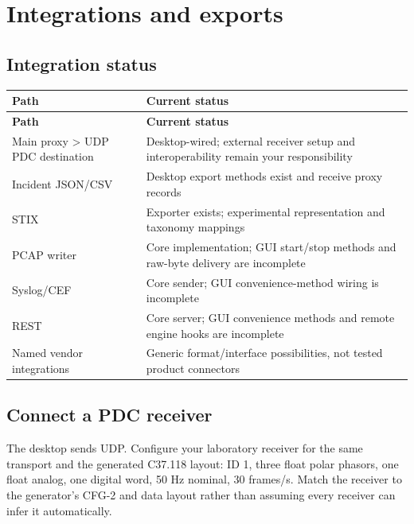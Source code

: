 \chapter{Integrations and exports}\label{chapter-9}
\section*{Integration status}
\begingroup
\fontsize{8.7}{11.8}\selectfont
\setlength{\tabcolsep}{5pt}
\renewcommand{\arraystretch}{1.23}
\begin{longtable}{@{}>{\raggedright\arraybackslash}p{}>{\raggedright\arraybackslash}p{}@{}}
\rowcolor{navy} \color{white}\bfseries Path & \color{white}\bfseries Current status \\
\endfirsthead
\rowcolor{navy} \color{white}\bfseries Path & \color{white}\bfseries Current status \\
\endhead
\endfoot
\rowcolor{pale}
Main proxy  >  UDP PDC destination & Desktop-wired; external receiver setup and interoperability remain your responsibility \\
Incident JSON/CSV & Desktop export methods exist and receive proxy records \\
\rowcolor{pale}
STIX & Exporter exists; experimental representation and taxonomy mappings \\
PCAP writer & Core implementation; GUI start/stop methods and raw-byte delivery are incomplete \\
\rowcolor{pale}
Syslog/CEF & Core sender; GUI convenience-method wiring is incomplete \\
REST & Core server; GUI convenience methods and remote engine hooks are incomplete \\
\rowcolor{pale}
Named vendor integrations & Generic format/interface possibilities, not tested product connectors \\
\end{longtable}
\endgroup

\section*{Connect a PDC receiver}
The desktop sends UDP. Configure your laboratory receiver for the same transport and the generated C37.118 layout: ID 1, three float polar phasors, one float analog, one digital word, 50 Hz nominal, 30 frames/s. Match the receiver to the generator's CFG-2 and data layout rather than assuming every receiver can infer it automatically.

